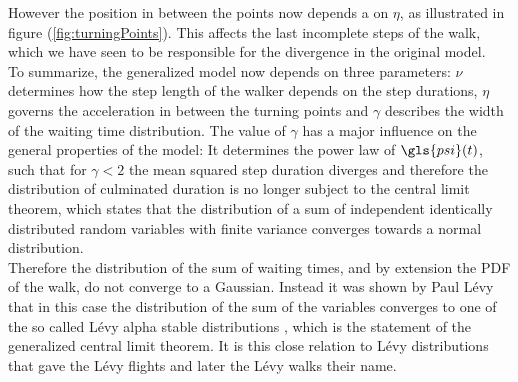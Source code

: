 However the position in between the points now depends a on $\eta$, as illustrated in figure (\ref{fig:turningPoints}). This affects the last incomplete steps of the walk, which we have seen to be responsible for the divergence in the original model. \\
To summarize, the generalized model now depends on three parameters: $\nu$ determines how the step length of the walker depends on the step durations, $\eta$ governs the acceleration in between the turning points and $\gamma$ describes the width of the waiting time distribution. 
{\color{blue}
The value of $\gamma$ has a major influence on the general properties of the model: It determines the power law of $\gls{psi}(t)$, such that for $\gamma < 2$ the mean squared step duration diverges and therefore the distribution of culminated duration is no longer subject to the central limit theorem, which states that the distribution of a sum of independent identically distributed random variables with finite variance converges towards a normal distribution. \\
Therefore the distribution of the sum of waiting times, and by extension the \gls{PDF} of the walk, do not converge to a Gaussian. Instead it was shown by Paul L\'evy that in this case the distribution of the sum of the variables converges to one of the so called L\'evy alpha stable distributions \cite{lwreview}, which  is the statement of the generalized central limit theorem.  
}
It is this close relation to L\'evy distributions that gave the L\'evy flights and later the L\'evy walks their name. \\


